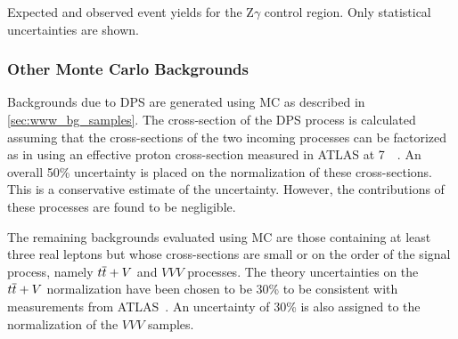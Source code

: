 \begin{table}[ht!]
\centering

\caption{Expected and observed event yields for the Z$\gamma$ control region. 
Only statistical uncertainties are shown.}
\label{tab:Zgamma_CR}
\end{table}



\subsubsection{Other Monte Carlo Backgrounds}
\label{sec:otherbg}


Backgrounds due to DPS are generated using MC as described
in \sec\ref{sec:www_bg_samples}. The cross-section of the DPS process
is calculated assuming that the cross-sections of the two incoming processes
can be factorized as in \cite{Gaunt:2010pi} using an effective
proton cross-section measured in ATLAS at 7~\TeV~\cite{Aad:2013bjm}.
An overall 50\% uncertainty is placed on the normalization of these cross-sections.
This is a conservative estimate of the uncertainty.
However, the contributions of these processes are found to be negligible.


The remaining backgrounds evaluated using MC are those containing 
at least three real leptons but whose cross-sections are small or on 
the order of the signal process, namely $t\overline{t}+V$ and $VVV$ processes.
The theory uncertainties on the $t\overline{t}+V$ normalization have been 
chosen to be 30\% to be consistent with measurements from
ATLAS~\cite{ATLAS-CONF-2015-032}. 
An uncertainty of 30\% is also assigned to the normalization of the 
$VVV$ samples.
